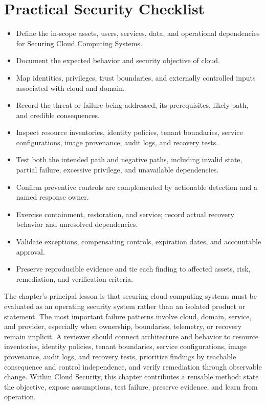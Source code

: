 \documentclass[11pt]{article}
\begin{document}
\section*{Practical Security Checklist}
\begin{itemize}[label=$\square$]
\item Define the in-scope assets, users, services, data, and operational dependencies for Securing Cloud Computing Systems.
\item Document the expected behavior and security objective of cloud.
\item Map identities, privileges, trust boundaries, and externally controlled inputs associated with cloud and domain.
\item Record the threat or failure being addressed, its prerequisites, likely path, and credible consequences.
\item Inspect resource inventories, identity policies, tenant boundaries, service configurations, image provenance, audit logs, and recovery tests.
\item Test both the intended path and negative paths, including invalid state, partial failure, excessive privilege, and unavailable dependencies.
\item Confirm preventive controls are complemented by actionable detection and a named response owner.
\item Exercise containment, restoration, and service; record actual recovery behavior and unresolved dependencies.
\item Validate exceptions, compensating controls, expiration dates, and accountable approval.
\item Preserve reproducible evidence and tie each finding to affected assets, risk, remediation, and verification criteria.
\end{itemize}
\begin{synthesisbox}
The chapter's principal lesson is that securing cloud computing systems must be evaluated as an operating security system rather than an isolated product or statement. The most important failure patterns involve cloud, domain, service, and provider, especially when ownership, boundaries, telemetry, or recovery remain implicit. A reviewer should connect architecture and behavior to resource inventories, identity policies, tenant boundaries, service configurations, image provenance, audit logs, and recovery tests, prioritize findings by reachable consequence and control independence, and verify remediation through observable change. Within Cloud Security, this chapter contributes a reusable method: state the objective, expose assumptions, test failure, preserve evidence, and learn from operation.
\end{synthesisbox}
\end{document}
